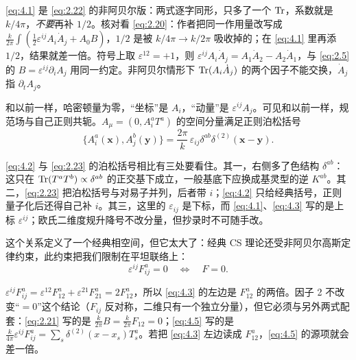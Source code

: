 \begin{yizhu}[易错点]
\eqref{eq:4.1} 是 \eqref{eq:2.22} 的非阿贝尔版：两式逐字同形，只多了一个 $\operatorname{Tr}$，系数就是 $k/4\pi$，\emph{不要}再补 $1/2$。核对看 \eqref{eq:2.20}：作者把同一作用量改写成 $\frac{k}{2\pi}\int(\frac12\varepsilon^{ij}A_i\dot A_j+A_0B)$，$1/2$ 是被 $k/4\pi\to k/2\pi$ 吸收掉的；在 \eqref{eq:4.1} 里再添 $1/2$，结果就差一倍。符号上取 $\varepsilon^{12}=+1$，则 $\varepsilon^{ij}A_i\dot A_j=A_1\dot A_2-A_2\dot A_1$，与 \eqref{eq:2.5} 的 $B=\varepsilon^{ij}\partial_iA_j$ 用同一约定。非阿贝尔情形下 $\operatorname{Tr}(A_i\dot A_j)$ 的两个因子不能交换，$\dot A_j$ 指 $\partial_tA_j$。
\end{yizhu}

和以前一样，哈密顿量为零，“坐标”是 $A_i$，“动量”是 $\varepsilon^{ij}A_j$。可见和以前一样，规范场与自己正则共轭。$A_\mu=(0,A_i^aT^a)$ 的空间分量满足正则泊松括号
\begin{equation}\tag{4.2}\label{eq:4.2}
  \bigl\{A_i^a(\mathbf{x}), A_j^b(\mathbf{y})\bigr\}
  = \frac{2\pi}{k}\,\varepsilon_{ij}\delta^{ab}\delta^{(2)}(\mathbf{x}-\mathbf{y}).
\end{equation}

\begin{yizhu}[易错点]
\eqref{eq:4.2} 与 \eqref{eq:2.23} 的泊松括号相比有三处要看住。其一，右侧多了色结构 $\delta^{ab}$：这只在 $\operatorname{Tr}(T^aT^b)\propto\delta^{ab}$ 的正交基下成立，一般基底下应换成基灵型的逆 $K^{ab}$。其二，\eqref{eq:2.23} 把泊松括号与对易子并列，后者带 $i$；\eqref{eq:4.2} 只给经典括号，正则量子化后还得自己补 $i$。其三，这里的 $\varepsilon_{ij}$ 是下标，而 \eqref{eq:4.1}、\eqref{eq:4.3} 写的是上标 $\varepsilon^{ij}$；欧氏二维度规升降号不改分量，但抄录时不可随手改。
\end{yizhu}

这个关系定义了一个经典相空间，但它太大了：经典 CS 理论还受非阿贝尔高斯定律约束，此约束把我们限制在平坦联络上：
\begin{equation}\tag{4.3}\label{eq:4.3}
  \varepsilon^{ij}F_{ij}^a = 0 \quad\Longleftrightarrow\quad F = 0.
\end{equation}

\begin{yizhu}[易错点]
$\varepsilon^{ij}F^a_{ij}=\varepsilon^{12}F^a_{12}+\varepsilon^{21}F^a_{21}=2F^a_{12}$，所以 \eqref{eq:4.3} 的左边是 $F^a_{12}$ 的两倍。因子 2 不改变“$=0$”这个结论（$F_{ij}$ 反对称，二维只有一个独立分量），但它必须与另外两式配套：\eqref{eq:2.21} 写的是 $\frac{k}{2\pi}B=\frac{k}{2\pi}F_{12}=0$；\eqref{eq:4.5} 写的是 $\frac{k}{4\pi}\varepsilon^{ij}F^a_{ij}=\sum_s\delta^{(2)}(x-x_s)T^a_s$。若把 \eqref{eq:4.3} 左边读成 $F^a_{12}$，\eqref{eq:4.5} 的源项就会差一倍。
\end{yizhu}

